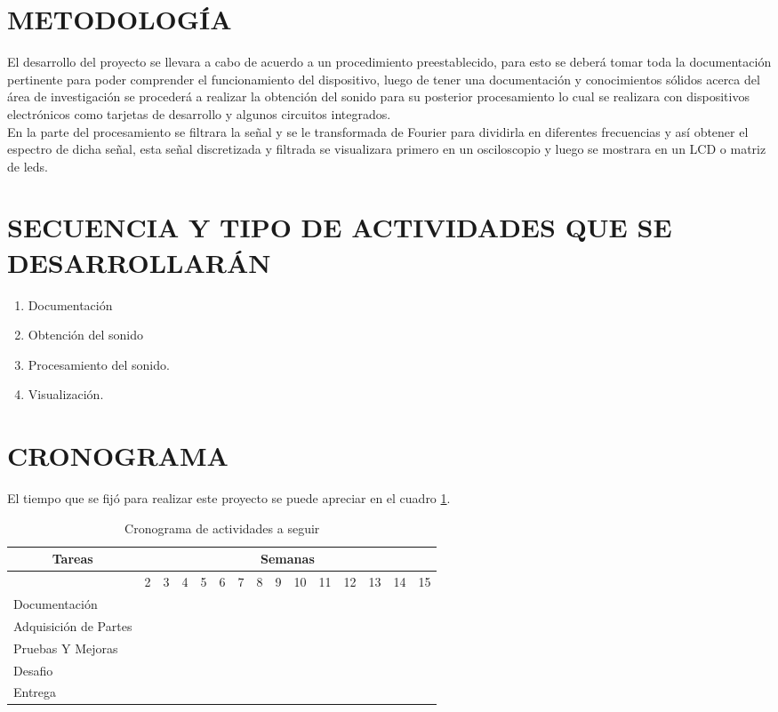 \documentclass[10pt,graphicx,caption,rotating]{article}
\begin{document}
\section{METODOLOGÍA}
\noindent
El desarrollo del proyecto se llevara a cabo de acuerdo a un procedimiento preestablecido, para esto se deberá tomar toda la documentación pertinente para poder comprender el funcionamiento del dispositivo, luego de tener una documentación y conocimientos sólidos acerca del área de investigación se procederá a realizar la obtención del sonido para su posterior procesamiento lo cual se realizara con dispositivos electrónicos como tarjetas de desarrollo y algunos circuitos integrados.\\
En la parte del procesamiento se filtrara la señal y se le transformada de Fourier para dividirla en diferentes frecuencias y así obtener el espectro de dicha señal, esta señal discretizada y filtrada se visualizara primero en un osciloscopio y luego se  mostrara en un LCD o matriz de leds.

\section{SECUENCIA Y TIPO DE ACTIVIDADES QUE SE DESARROLLARÁN}
\noindent
\begin{enumerate}
 \item Documentación
 \item Obtención del sonido
 \item Procesamiento del sonido.
 \item Visualización.
\end{enumerate}


\section{CRONOGRAMA}
\noindent
El tiempo que se fijó para realizar este proyecto se puede apreciar en el cuadro \ref{tab1}.

\begin{table}[H]
	\centering
\begin{tabular}{|l|c|c|c|c|c|c|c|c|c|c|c|c|c|c|}\hline
\multicolumn{1}{|c|}{Tareas} & \multicolumn{14}{|c|}{Semanas} \\ \hline
 & 2 & 3 & 4 & 5 & 6 & 7 & 8 & 9 & 10 & 11 & 12 & 13 & 14 & 15 \\ \hline
Documentación & & \cellcolor{black} & \cellcolor{black} & \cellcolor{black} & \cellcolor{black} & & & & & & & & & \\ \hline
Adquisición de Partes & & & & & & \cellcolor{black} & \cellcolor{black} & & & & & & & \\ \hline
Pruebas Y Mejoras & & & & & & & & \cellcolor{black} & \cellcolor{black} & \cellcolor{black} & & & & \\ \hline
Desafio & & & & & & & & & & & \cellcolor{black} & & & \\ \hline
Entrega & & & & & & & & & & & & \cellcolor{black} & \cellcolor{black} & \cellcolor{black} \\ \hline
    \end{tabular}
	\caption{Cronograma de actividades a seguir}
	\label{tab1}
\end{table}
\end{document}
